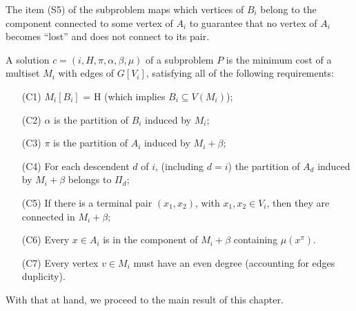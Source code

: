 The item (S5) of the subproblem maps which vertices of \(B_i\) belong to the component connected to some vertex of \(A_i\) to guarantee that no vertex of \(A_i\) becomes ``lost'' and does not connect to its pair.

A solution \(c = (i, H, \pi, \alpha, \beta, \mu)\) of a subproblem \(P\) is the minimum cost of a multiset \(M_i\) with edges of \(G[V_i]\), satisfying all of the following requirements:

\begin{itemize}
    \item[(C1)] \(M_i[B_i]\) = H (which implies \(B_i \subseteq V(M_i)\));
    \item[(C2)] \(\alpha\) is the partition of \(B_i\) induced by \(M_i\);
    \item[(C3)] \(\pi\) is the partition of \(A_i\) induced by \(M_i + \beta\);
    \item[(C4)] For each descendent \(d\) of \(i\), (including \(d = i\)) the partition of \(A_d\) induced by \(M_i + \beta\) belongs to \(\Pi_d\);
    \item[(C5)] If there is a terminal pair \((x_1, x_2)\), with \(x_1, x_2 \in V_i\), then they are connected in \(M_i + \beta\);
    \item[(C6)] Every \(x \in A_i\) is in the component of \(M_i + \beta\) containing \(\mu(x^\pi)\).
    \item[(C7)] Every vertex \(v \in M_i\) must have an even degree (accounting for edges duplicity).
\end{itemize}

With that at hand, we proceed to the main result of this chapter.

